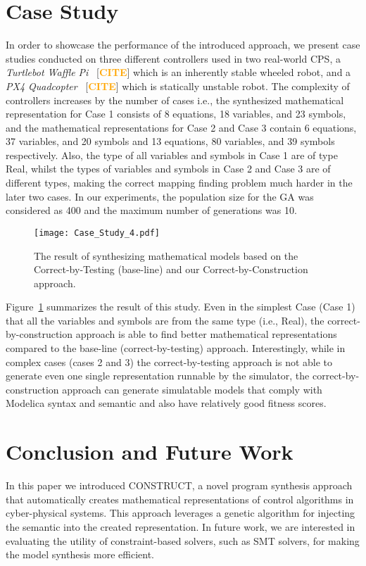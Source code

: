 \documentclass[sigconf,review]{acmart}
\renewcommand{\hl}[1]{#1}
\newcommand{\citeme}[1]{%
  \begingroup
  \definecolor{hlcolor}{RGB}{255, 226, 176}\sethlcolor{hlcolor}%
  [\textcolor{orange}{\hl{\textbf{CITE}}}]%
  \endgroup
}
\begin{document}
\section{Case Study}
\label{sec:PreliminaryResult}
In order to showcase the performance of the introduced approach, we present case studies conducted on three different controllers used in two real-world CPS, a \textit{Turtlebot Waffle Pi}~\citeme{} which is an inherently stable wheeled robot, and a \textit{PX4 Quadcopter}~\citeme{} which is statically unstable robot. The complexity of controllers increases by the number of cases i.e., the synthesized mathematical representation for Case 1 consists of 8 equations, 18 variables, and 23 symbols, and the mathematical representations for Case 2 and Case 3 contain 6 equations, 37 variables, and 20 symbols and 13 equations, 80 variables, and 39 symbols respectively. Also, the type of all variables and symbols in Case 1 are of type Real, whilst the types of variables and symbols in Case 2 and Case 3 are of different types, making the correct mapping finding problem much harder in the later two cases. In our experiments, the population size for the GA was considered as 400 and the maximum number of generations was 10.
%
\begin{figure}[ht]
  \centering
  \texttt{[image: Case\_Study\_4.pdf]}
  \caption{The result of synthesizing mathematical models based on the Correct-by-Testing (base-line) and our Correct-by-Construction approach.}
  \label{fig:correct_by_construct_result}
\end{figure}
%
 Figure~\ref{fig:correct_by_construct_result} summarizes the result of this study. Even in the simplest Case (Case 1) that all the variables and symbols are from the same type (i.e., Real), the correct-by-construction approach is able to find better mathematical representations compared to the base-line (correct-by-testing) approach. Interestingly, while in complex cases (cases 2 and 3) the correct-by-testing approach is not able to generate even one single representation runnable by the simulator, the correct-by-construction approach can generate simulatable models that comply with Modelica syntax and semantic and also have relatively good fitness scores.


\section{Conclusion and Future Work}
\label{sec:Conclusion}
In this paper we introduced CONSTRUCT, a novel program synthesis approach that automatically creates mathematical representations of control algorithms in cyber-physical systems. This approach leverages a genetic algorithm for injecting the semantic into the created representation. In future work, we are interested in evaluating the utility of constraint-based solvers, such as SMT solvers, for making the model synthesis more efficient.



\end{document}
